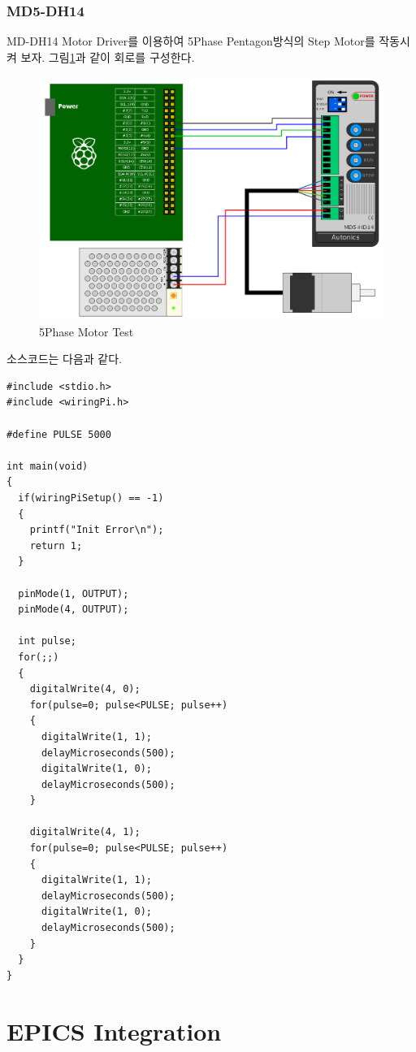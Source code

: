 \documentclass[11pt
  , a4paper
  , article
  , oneside
]{memoir}
\begin{document}
\subsection{MD5-DH14}
MD-DH14 Motor Driver를 이용하여 5Phase Pentagon방식의 Step Motor를 작동시켜 보자.
그림\ref{fig:5phase_test}과 같이 회로를 구성한다.
\begin{figure}[!htb]
\centering
\includegraphics[width=1\textwidth]{./images/raspberry/md5dh14Test.png}
\caption{5Phase Motor Test}
\label{fig:5phase_test}
\end{figure}
소스코드는 다음과 같다.
\begin{lstlisting}[style=termstylenumber, caption={md5dh14.c}, label={list:md5dh14TestCode}]
#include <stdio.h>
#include <wiringPi.h>

#define PULSE 5000

int main(void)
{
  if(wiringPiSetup() == -1)
  {
    printf("Init Error\n");
    return 1;
  }

  pinMode(1, OUTPUT);
  pinMode(4, OUTPUT);

  int pulse;
  for(;;)
  {
    digitalWrite(4, 0);
    for(pulse=0; pulse<PULSE; pulse++)
    {
      digitalWrite(1, 1);
      delayMicroseconds(500);
      digitalWrite(1, 0);
      delayMicroseconds(500);
    }

    digitalWrite(4, 1);
    for(pulse=0; pulse<PULSE; pulse++)
    {
      digitalWrite(1, 1);
      delayMicroseconds(500);
      digitalWrite(1, 0);
      delayMicroseconds(500);
    }
  }
}

\end{lstlisting}
\chapter{EPICS Integration}
\end{document}
